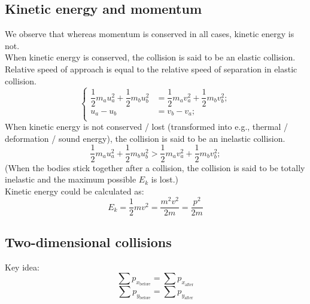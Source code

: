 \subsection{Kinetic energy and momentum}
We observe that whereas momentum is conserved in all cases, kinetic energy is not.\\
When kinetic energy is conserved, the collision is said to be an elastic collision. Relative speed of approach is equal to the relative speed of separation in elastic collision.
\[\left\{
\begin{aligned}
\dfrac{1}{2}m_au_a^2+\dfrac{1}{2}m_bu_b^2&=\dfrac{1}{2}m_av_a^2+\dfrac{1}{2}m_bv_b^2;\\
u_a-u_b&=v_b-v_a;\\
\end{aligned}\right. \]
When kinetic energy is not conserved / lost (transformed into e.g., thermal / deformation / sound energy), the collision is said to be an inelastic collision.
\[\dfrac{1}{2}m_au_a^2+\dfrac{1}{2}m_bu_b^2>\dfrac{1}{2}m_av_a^2+\dfrac{1}{2}m_bv_b^2;\]
(When the bodies stick together after a collision, the collision is said to be totally inelastic and the maximum possible $E_k$ is lost.)\\
Kinetic energy could be calculated as:
\[E_k=\dfrac{1}{2}mv^2=\dfrac{m^2v^2}{2m}=\dfrac{p^2}{2m}\]
\subsection{Two-dimensional collisions}
\begin{center}
\end{center}
Key idea:
\[\sum p_{x_\text{before}}=\sum p_{x_\text{after}}\]
\[\sum p_{y_\text{before}}=\sum p_{y_\text{after}}\]
